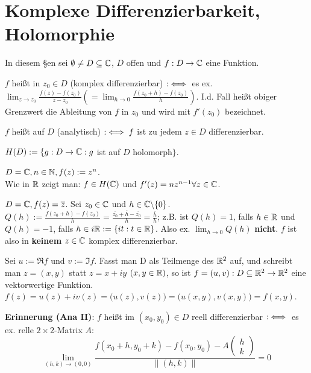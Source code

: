 \documentclass[a4paper,twoside,DIV15,BCOR12mm]{scrbook}
\def\gdw{\equizu}
\def\gdw{\equizu}
\begin{document}
\chapter{Komplexe Differenzierbarkeit, Holomorphie}

In diesem §en sei $\emptyset \neq D \subseteq \mathbb{C}$, $D$ offen und $f: D \rightarrow \mathbb{C}$ eine Funktion.

\begin{definition}
\begin{liste}
\item $f$ heißt in $z_0 \in D$  (komplex differenzierbar) $:\gdw$ es ex. $\lim_{z \rightarrow z_0} \frac{f(z) - f(z_0)}{z - z_0} (= \lim_{h \rightarrow 0} \frac{f(z_0 + h) - f(z_0)}{h})$. I.d. Fall heißt obiger Grenzwert die Ableitung von $f$ in $z_0$ und wird mit $f'(z_0)$ bezeichnet.
\item $f$ heißt auf $D$  (analytisch) $: \gdw f$ ist zu jedem $z \in D$ differenzierbar.
\item $H(D) := \{g : D \rightarrow \mathbb{C}: g$ ist auf $D$ holomorph$\}$.
\end{liste}
\end{definition}

\begin{beispiele}
\item $D = \mathbb{C}, n \in \mathbb{N}, f(z) := z^n$. \\
Wie in $\mathbb{R}$ zeigt man: $f \in H(\mathbb{C})$ und $f'(z) = nz^{n-1} \forall z \in \mathbb{C}$.
\item $D =  \mathbb{C}, f(z) = \overline{z}$. Sei $z_0 \in \mathbb{C}$ und $h \in \mathbb{C} \backslash\{0\}$. \\
$Q(h) := \frac{f(z_0 + h) - f(z_0)}{h} = \frac{\overline{z_0} + \overline{h} - \overline{z_0}}{h} = \frac{\overline{h}}{h}$; z.B. ist $Q(h) = 1$, falls $h \in \mathbb{R}$ und $Q(h) = -1$, falls $h \in i\mathbb{R} := \{it : t \in \mathbb{R}\}$. Also ex. $\lim_{h \rightarrow 0} Q(h)$ \textbf{nicht}. $f$ ist also in \textbf{keinem} $z \in \mathbb{C}$ komplex differenzierbar.
\end{beispiele}

Sei $u := \Re f$ und $v := \Im f$. Fasst man D als Teilmenge des $\mathbb{R} ^2$ auf, und schreibt man $z = (x,y)$ statt $z = x + iy $ $(x,y \in \mathbb{R})$, so ist $f = (u,v): D \subseteq \mathbb{R} ^2 \rightarrow \mathbb{R} ^2$ eine vektorwertige Funktion. \\
$f(z) = u(z) + iv(z) = \big(u(z),v(z)\big) = \big(u(x,y),v(x,y)\big) = f(x,y)$.

\textbf{Erinnerung (Ana II)}: $f$ heißt im $(x_0, y_0) \in D$ reell differenzierbar $:\gdw$ es ex. relle $2\times 2$-Matrix $A$: \\
$$\lim_{(h,k) \rightarrow (0,0)} \frac{f(x_0 + h,y_0 + k) - f(x_0,y_0) - A \begin{pmatrix}h\\k\end{pmatrix}}{\|(h,k)\|} = 0$$
\end{document}
